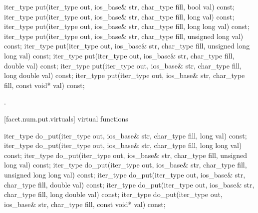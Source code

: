 %
\begin{itemdecl}
iter_type put(iter_type out, ios_base& str, char_type fill,
  bool val) const;
iter_type put(iter_type out, ios_base& str, char_type fill,
  long val) const;
iter_type put(iter_type out, ios_base& str, char_type fill,
  long long val) const;
iter_type put(iter_type out, ios_base& str, char_type fill,
  unsigned long val) const;
iter_type put(iter_type out, ios_base& str, char_type fill,
  unsigned long long val) const;
iter_type put(iter_type out, ios_base& str, char_type fill,
  double val) const;
iter_type put(iter_type out, ios_base& str, char_type fill,
  long double val) const;
iter_type put(iter_type out, ios_base& str, char_type fill,
  const void* val) const;
\end{itemdecl}

\begin{itemdescr}
\pnum
\returns
{}.
\end{itemdescr}

[facet.num.put.virtuals]{ virtual functions}

%
\begin{itemdecl}
iter_type do_put(iter_type out, ios_base& str, char_type fill,
  long val) const;
iter_type do_put(iter_type out, ios_base& str, char_type fill,
  long long val) const;
iter_type do_put(iter_type out, ios_base& str, char_type fill,
  unsigned long val) const;
iter_type do_put(iter_type out, ios_base& str, char_type fill,
  unsigned long long val) const;
iter_type do_put(iter_type out, ios_base& str, char_type fill,
  double val) const;
iter_type do_put(iter_type out, ios_base& str, char_type fill,
  long double val) const;
iter_type do_put(iter_type out, ios_base& str, char_type fill,
  const void* val) const;
\end{itemdecl}

